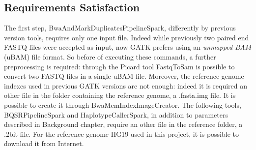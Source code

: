 \subsection{Requirements Satisfaction}
The first step, BwaAndMarkDuplicatesPipelineSpark, differently by previous version tools, requires only one input file. Indeed while previously two paired end FASTQ files were accepted as input, now GATK prefers using an \textit{unmapped BAM} (uBAM) file format. So before of executing these commands, a further preprocessing is required: through the Picard tool FastqToSam is possible to convert two FASTQ files in a single uBAM file.\newline
Moreover, the reference genome indexes used in previous GATK versions are not enough: indeed it is required an other file in the folder containing the reference genome, a .fasta.img file. It is possible to create it through BwaMemIndexImageCreator.\newline
The following tools, BQSRPipelineSpark and HaplotypeCallerSpark, in addition to parameters described in Background chapter, require an other file in the reference folder, a .2bit file. For the reference genome HG19 used in this project, it is possible to download it from Internet.

